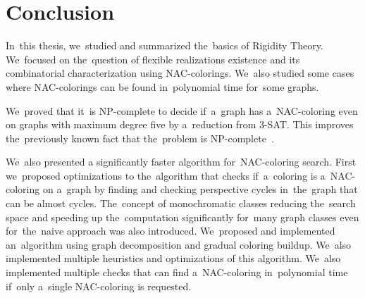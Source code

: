 
\chapter*{Conclusion}



In~this thesis,
we~studied and summarized the~basics of Rigidity Theory.
We~focused on the~question of flexible realizations existence
and its combinatorial characterization using NAC-colorings.
We~also studied some cases where NAC-colorings can be found in~polynomial time
for~some graphs.

We~proved that it~is NP-complete
to decide if~a~graph has a~NAC-coloring even on graphs with maximum degree five
by a~reduction from 3-SAT\@.
This improves the~previously known fact that the~problem is NP-complete~\cite{np_complete}.

We~also presented a significantly faster algorithm
for~NAC-coloring search.
%
First we~proposed optimizations to the~algorithm
that checks if~a~coloring is a~NAC-coloring on a~graph
by finding and checking perspective cycles in~the~graph
that can be almost cycles.
%
The~concept of monochromatic classes reducing the~search space
and speeding up the~computation significantly for~many graph classes
even for~the~naive approach was also introduced.
%
We~proposed and implemented an~algorithm using graph decomposition and gradual coloring buildup.
We~also implemented multiple heuristics and optimizations of this algorithm.
%
We~also implemented multiple checks that can find a~NAC-coloring in~polynomial time
if~only a~single NAC-coloring is requested.

